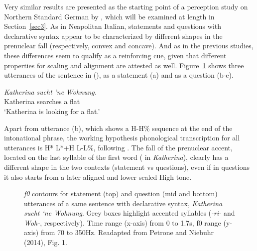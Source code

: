 Very similar results are presented as the starting point of a perception study on Northern Standard German by \cite{petrone2014intonation}, which will be examined at length in Section~\ref{sec3}. As in Neapolitan Italian, statements and questions with declarative syntax appear to be characterized by different shapes in the prenuclear fall (respectively, convex and concave). And as in the previous studies, these differences seem to qualify as a reinforcing cue, given that different properties for scaling and alignment are attested as well. Figure~\ref{fig211} shows three utterances of the sentence in (), as a statement (a) and as a question (b-c). 

\ea
\gll \textit{Katherina} \textit{sucht} \textit{'ne} \textit{Wohnung.}\\
Katherina searches a flat\\
\glt ‘Katherina is looking for a flat.’
\z

Apart from utterance (b), which shows a H-H\% sequence at the end of the intonational phrase, the working hypothesis phonological transcription for all utterances is H* L*+H L-L\%, following \citet{grice2002deutsche}. The fall of the prenuclear accent, located on the last syllable of the first word (\textipa{[na]} in \textit{Katherina}), clearly has a different shape in the two contexts (statement vs questions), even if in questions it also starts from a later aligned and lower scaled High tone.

\begin{figure}
\centering
{}
\caption{\textit{f0} contours for statement (top) and question (mid and bottom) utterances of a same sentence with declarative syntax, \textit{Katherina sucht `ne Wohnung}. Grey boxes highlight accented syllables (\textit{-ri-} and \textit{Woh-}, respectively). Time range (x-axis) from 0 to 1.7s, f0 range (y-axis) from 70 to 350Hz. Readapted from Petrone and Niebuhr (2014), Fig. 1.}
\label{fig211}\end{figure}

